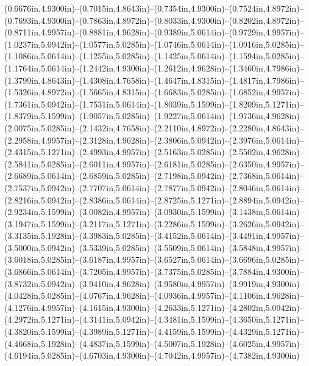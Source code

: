 (0.6676in,4.9300in)--(0.7015in,4.8643in)--(0.7354in,4.9300in)--(0.7524in,4.8972in)--(0.7693in,4.9300in)--(0.7863in,4.8972in)--(0.8033in,4.9300in)--(0.8202in,4.8972in)--(0.8711in,4.9957in)--(0.8881in,4.9628in)--(0.9389in,5.0614in)--(0.9729in,4.9957in)--(1.0237in,5.0942in)--(1.0577in,5.0285in)--(1.0746in,5.0614in)--(1.0916in,5.0285in)--(1.1086in,5.0614in)--(1.1255in,5.0285in)--(1.1425in,5.0614in)--(1.1594in,5.0285in)--(1.1764in,5.0614in)--(1.2442in,4.9300in)--(1.2612in,4.9628in)--(1.3460in,4.7986in)--(1.3799in,4.8643in)--(1.4308in,4.7658in)--(1.4647in,4.8315in)--(1.4817in,4.7986in)--(1.5326in,4.8972in)--(1.5665in,4.8315in)--(1.6683in,5.0285in)--(1.6852in,4.9957in)--(1.7361in,5.0942in)--(1.7531in,5.0614in)--(1.8039in,5.1599in)--(1.8209in,5.1271in)--(1.8379in,5.1599in)--(1.9057in,5.0285in)--(1.9227in,5.0614in)--(1.9736in,4.9628in)--(2.0075in,5.0285in)--(2.1432in,4.7658in)--(2.2110in,4.8972in)--(2.2280in,4.8643in)--(2.2958in,4.9957in)--(2.3128in,4.9628in)--(2.3806in,5.0942in)--(2.3976in,5.0614in)--(2.4315in,5.1271in)--(2.4993in,4.9957in)--(2.5163in,5.0285in)--(2.5502in,4.9628in)--(2.5841in,5.0285in)--(2.6011in,4.9957in)--(2.6181in,5.0285in)--(2.6350in,4.9957in)--(2.6689in,5.0614in)--(2.6859in,5.0285in)--(2.7198in,5.0942in)--(2.7368in,5.0614in)--(2.7537in,5.0942in)--(2.7707in,5.0614in)--(2.7877in,5.0942in)--(2.8046in,5.0614in)--(2.8216in,5.0942in)--(2.8386in,5.0614in)--(2.8725in,5.1271in)--(2.8894in,5.0942in)--(2.9234in,5.1599in)--(3.0082in,4.9957in)--(3.0930in,5.1599in)--(3.1438in,5.0614in)--(3.1947in,5.1599in)--(3.2117in,5.1271in)--(3.2286in,5.1599in)--(3.2626in,5.0942in)--(3.3135in,5.1928in)--(3.3983in,5.0285in)--(3.4152in,5.0614in)--(3.4491in,4.9957in)--(3.5000in,5.0942in)--(3.5339in,5.0285in)--(3.5509in,5.0614in)--(3.5848in,4.9957in)--(3.6018in,5.0285in)--(3.6187in,4.9957in)--(3.6527in,5.0614in)--(3.6696in,5.0285in)--(3.6866in,5.0614in)--(3.7205in,4.9957in)--(3.7375in,5.0285in)--(3.7884in,4.9300in)--(3.8732in,5.0942in)--(3.9410in,4.9628in)--(3.9580in,4.9957in)--(3.9919in,4.9300in)--(4.0428in,5.0285in)--(4.0767in,4.9628in)--(4.0936in,4.9957in)--(4.1106in,4.9628in)--(4.1276in,4.9957in)--(4.1615in,4.9300in)--(4.2633in,5.1271in)--(4.2802in,5.0942in)--(4.2972in,5.1271in)--(4.3141in,5.0942in)--(4.3481in,5.1599in)--(4.3650in,5.1271in)--(4.3820in,5.1599in)--(4.3989in,5.1271in)--(4.4159in,5.1599in)--(4.4329in,5.1271in)--(4.4668in,5.1928in)--(4.4837in,5.1599in)--(4.5007in,5.1928in)--(4.6025in,4.9957in)--(4.6194in,5.0285in)--(4.6703in,4.9300in)--(4.7042in,4.9957in)--(4.7382in,4.9300in)
